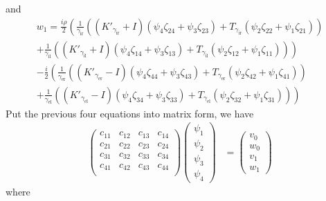 and
\begin{multline*}
  w_1 = \frac{i \rho}{2} \left(\frac{1}{\gamma_\text{ir}}\left((K'_{\gamma_\text{ir}} + I)(\psi_4 \zeta_{24}+\psi_3 \zeta_{23}) +T_{\gamma_\text{ir}} (\psi_2 \zeta_{22}+\psi_1 \zeta_{21})\right)\right. \\
  \left.+\frac{1}{\gamma_\text{il}}\left((K'_{\gamma_\text{il}} + I)(\psi_4 \zeta_{14}+\psi_3 \zeta_{13}) +T_{\gamma_\text{il}} (\psi_2 \zeta_{12}+\psi_1 \zeta_{11})\right)\right) \\
  - \frac{i}{2} \left(\frac{1}{\gamma_\text{er}}\left((K'_{\gamma_\text{er}}-I)(\psi_4 \zeta_{44}+\psi_3 \zeta_{43}) +T_{\gamma_\text{er}} (\psi_2 \zeta_{42}+\psi_1 \zeta_{41})\right)\right. \\
  \left.+\frac{1}{\gamma_\text{el}}\left((K'_{\gamma_\text{el}}-I)(\psi_4 \zeta_{34}+\psi_3 \zeta_{33}) +T_{\gamma_\text{el}} (\psi_2 \zeta_{32}+\psi_1 \zeta_{31})\right)\right) 
\end{multline*}
Put the previous four equations into matrix form, we have
\begin{align*}
  \begin{pmatrix}
    c_{11} & c_{12} & c_{13} & c_{14} \\
    c_{21} & c_{22} & c_{23} & c_{24} \\
    c_{31} & c_{32} & c_{33} & c_{34} \\
    c_{41} & c_{42} & c_{43} & c_{44} \\
  \end{pmatrix} 
  \begin{pmatrix}
    \psi_1 \\ \psi_2 \\ \psi_3 \\ \psi_4
  \end{pmatrix} &=
  \begin{pmatrix}
    v_0 \\ w_0 \\ v_1 \\ w_1
  \end{pmatrix}
\end{align*}
where
